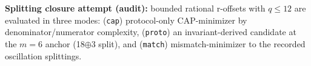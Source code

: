 \textbf{Splitting closure attempt (audit):} bounded rational r-offsets with $q\le 12$ are evaluated in three modes: (\texttt{cap}) protocol-only CAP-minimizer by denominator/numerator complexity, (\texttt{proto}) an invariant-derived candidate at the $m=6$ anchor (18$\oplus$3 split), and (\texttt{match}) mismatch-minimizer to the recorded oscillation splittings.